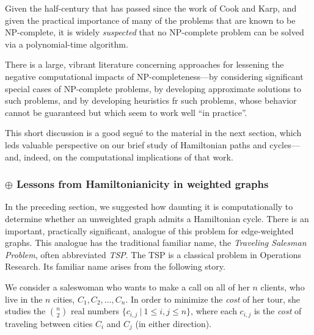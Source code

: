 Given the half-century that has passed since the work of Cook and
Karp, and given the practical importance of many of the problems that
are known to be {\sf NP}-complete, it is widely {\em suspected} that
no {\sf NP}-complete problem can be solved via a polynomial-time
algorithm.

There is a large, vibrant literature concerning approaches for
lessening the negative computational impacts of {\sf
  NP}-completeness---by considering significant special cases of {\sf
  NP}-complete problems, by developing approximate solutions to such
problems, and by developing heuristics fr such problems, whose
behavior cannot be guaranteed but which seem to work well ``in
practice''.

\medskip

This short discussion is a good segu\'{e} to the material in the next
section, which leds valuable perspective on our brief study of
Hamiltonian paths and cycles---and, indeed, on the computational
implications of that work.

\subsubsection{$\oplus$ Lessons from Hamiltonianicity in weighted graphs}
\label{sec:TSP}

In the preceding section,
we suggested how daunting it is computationally to determine whether
an unweighted graph admits a Hamiltonian cycle.  There is an
important, practically significant, analogue of this problem for
edge-weighted graphs.  This analogue has the traditional familiar
name, the {\it Traveling Salesman Problem}, often abbreviated {\it
  TSP}.  
  The TSP is a classical problem in Operations
Research.  Its familiar name arises from the following story.

We consider a saleswoman who wants to make a call on all of her $n$
clients, who live in the $n$ cities, $C_1, C_2, \ldots, C_n$.  In
order to minimize the {\it cost} of her tour, she studies the
$\displaystyle {n \choose 2}$ real numbers $\{c_{i,j} \ | \ 1 \leq i,j
\leq n\}$, where each $c_{i,j}$ is the {\it cost} of traveling between
cities $C_i$ and $C_j$ (in either direction).  
\bigskip

